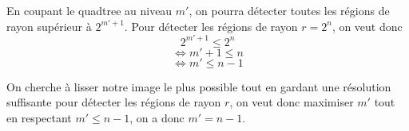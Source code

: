 	En coupant le quadtree au niveau $m'$, on pourra détecter toutes les régions de rayon supérieur à $2^{m'+1}$. Pour détecter les régions de rayon $r=2^n$, on veut donc
	\[ 2^{m'+1} \leq 2^n \]
	\[ \Leftrightarrow m'+1 \leq n \]
	\[ \Leftrightarrow m' \leq n-1 \]

	On cherche à lisser notre image le plus possible tout en gardant une résolution suffisante pour détecter les régions de rayon $r$, on veut donc maximiser $m'$ tout en respectant $m' \leq n-1$, on a donc $m' = n-1$.